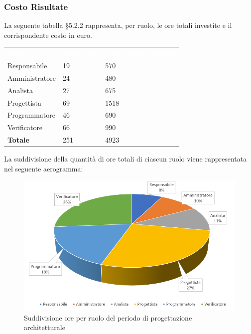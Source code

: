 \subsubsection{Costo Risultate}
La seguente tabella §5.2.2 rappresenta, per ruolo, le ore totali investite e il corrispondente costo in euro.
{
	\renewcommand{\arraystretch}{2}
	\centering
	\begin{longtable}{ C{3cm} C{2cm} C{4cm}}
		\textcolor{white}{\textbf{Ruolo}} & \textcolor{white}{\textbf{Totale ore}} & \textcolor{white}{\textbf{Costo Ruolo in euro}}\\	
        
        Responsabile & 19 & 570 \\
        Amministratore & 24 & 480 \\
        Analista & 27 & 675 \\
        Progettista & 69 & 1518 \\
        Programmatore & 46 & 690 \\
        Verificatore & 66 & 990 \\
        \textbf{Totale} & 251 & 4923 \\
		
	\end{longtable}
}

La suddivisione della quantità di ore totali di ciascun ruolo viene rappresentata nel seguente aerogramma:

\begin{figure}[h]
	\centering
	\includegraphics[scale=2]{sezioni/Aerogrammi/AerogrammaProgettArchitetturale.png}
	\caption{Suddivisione ore per ruolo del periodo di progettazione architetturale}
\end{figure}

